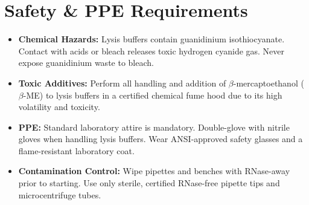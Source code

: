 \section{Safety \& PPE Requirements}
\begin{safetywarning}
\begin{itemize}
  \item \textbf{Chemical Hazards:} Lysis buffers contain guanidinium isothiocyanate. Contact with acids or bleach releases toxic hydrogen cyanide gas. Never expose guanidinium waste to bleach.
  \item \textbf{Toxic Additives:} Perform all handling and addition of $\beta$-mercaptoethanol ($\beta$-ME) to lysis buffers in a certified chemical fume hood due to its high volatility and toxicity.
  \item \textbf{PPE:} Standard laboratory attire is mandatory. Double-glove with nitrile gloves when handling lysis buffers. Wear ANSI-approved safety glasses and a flame-resistant laboratory coat.
  \item \textbf{Contamination Control:} Wipe pipettes and benches with RNase-away prior to starting. Use only sterile, certified RNase-free pipette tips and microcentrifuge tubes.
\end{itemize}
\end{safetywarning}
